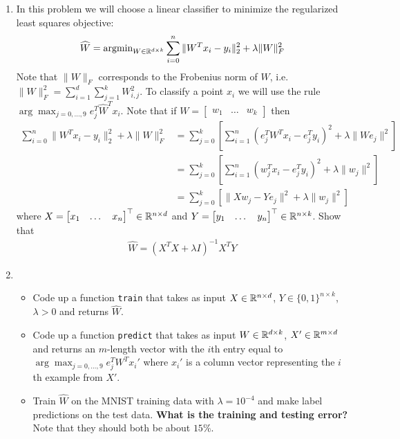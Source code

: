 \begin{enumerate}
\item {} In this problem we will choose a linear classifier to minimize the regularized least squares objective:
\begin{align*}\widehat{W} = \text{argmin}_{W \in \mathbb{R}^{d \times k}} \sum_{i=0}^{n} \| W^Tx_{i} - y_{i} \|^{2}_{2} + \lambda \|W\|_{F}^{2}
\end{align*}
 Note that $\|W\|_{F}$ corresponds to the Frobenius norm of $W$, i.e. $\|W\|_{F}^{2} = \sum_{i=1}^d \sum_{j=1}^k W_{i,j}^2$.
 To classify a point $x_i$ we will use the rule $\arg\max_{j=0,\dots,9} e_j^T \widehat{W}^T x_i$.
Note that if $W = \begin{bmatrix} w_1 & \dots & w_k \end{bmatrix}$ then
\begin{align*}
\sum_{i=0}^{n} \| W^Tx_{i} - y_{i} \|^{2}_{2} + \lambda \|W\|_{F}^{2} &= \sum_{j=0}^k \left[  \sum_{i=1}^n ( e_j^T W^T x_i - e_j^T y_i)^2 + \lambda \| W e_j \|^2 \right] \\
&= \sum_{j=0}^k \left[  \sum_{i=1}^n ( w_j^T x_i - e_j^T y_i)^2 + \lambda \| w_j \|^2 \right] \\
&= \sum_{j=0}^k \left[  \| X w_j - Y e_j\|^2 + \lambda \| w_j \|^2 \right]
\end{align*}
where $X = \begin{bmatrix} x_1 & \dots & x_n \end{bmatrix}^\top \in \mathbb{R}^{n \times d}$ and $Y = \begin{bmatrix} y_1 & \dots & y_n \end{bmatrix}^\top \in \mathbb{R}^{n \times k}$.
Show that
\begin{align*}
\widehat{W} = (X^T X + \lambda I)^{-1} X^T Y
\end{align*} 



\item {} 
\begin{itemize}
    \item Code up a function \verb|train| that takes as input $X \in\mathbb{R}^{n \times d}$, $Y \in \{0,1\}^{n \times k}$, $\lambda > 0$ and returns $\widehat{W}$.
    \item Code up a function  \verb|predict| that takes as input $W \in \mathbb{R}^{d \times k}$, $X' \in\mathbb{R}^{m \times d}$ and returns an $m$-length vector with the $i$th entry equal to $\arg\max_{j=0,\dots,9} e_j^T W^T x_i'$ where $x_i'$ is a column vector representing the $i$th example from $X'$.
    \item Train $\widehat{W}$ on the MNIST training data with $\lambda = 10^{-4}$ and make label predictions on the test data. 
{\bf What is the training and testing error?} Note that they should both be about $15\%$. 
\end{itemize}

\end{enumerate}
